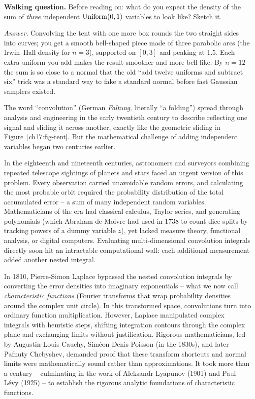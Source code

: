 \begin{walkbox}
\textbf{Walking question.} Before reading on: what do you expect the
density of the sum of \emph{three} independent $\operatorname{Uniform}(0,1)$ variables to
look like? Sketch it.

\emph{Answer.} Convolving the tent with one more box rounds the two
straight sides into curves; you get a smooth bell-shaped piece made of
three parabolic arcs (the Irwin--Hall density for $n=3$), supported on
$[0,3]$ and peaking at $1.5$. Each extra uniform you add makes the result
smoother and more bell-like. By $n=12$ the sum is so close to a normal
that the old ``add twelve uniforms and subtract six'' trick was a standard
way to fake a standard normal before fast Gaussian samplers existed.
\end{walkbox}

\begin{historybox}
The word ``convolution'' (German \emph{Faltung}, literally ``a folding'')
spread through analysis and engineering in the early twentieth century to
describe reflecting one signal and sliding it across another, exactly like
the geometric sliding in Figure~\ref{ch17:fig-tent}. But the mathematical
challenge of adding independent variables began two centuries earlier.

In the eighteenth and nineteenth centuries, astronomers and surveyors
combining repeated telescope sightings of planets and stars faced an urgent
version of this problem. Every observation carried unavoidable random errors,
and calculating the most probable orbit required the probability distribution
of the total accumulated error -- a sum of many independent random variables.
Mathematicians of the era had classical calculus, Taylor series, and generating
polynomials (which Abraham de Moivre had used in 1738 to count dice splits by
tracking powers of a dummy variable $z$), yet lacked measure theory, functional
analysis, or digital computers. Evaluating multi-dimensional convolution
integrals directly soon hit an intractable computational wall: each additional
measurement added another nested integral.

In 1810, Pierre-Simon Laplace bypassed the nested convolution integrals by
converting the error densities into imaginary exponentials -- what we now call
\emph{characteristic functions} (Fourier transforms that wrap probability
densities around the complex unit circle). In this transformed space,
convolutions turn into ordinary function multiplication.
However, Laplace manipulated complex integrals with heuristic steps,
shifting integration contours through the complex plane and exchanging
limits without justification. Rigorous mathematicians, led by
Augustin-Louis Cauchy, Sim\'eon Denis Poisson (in the 1830s), and later
Pafnuty Chebyshev, demanded proof that these transform shortcuts and
normal limits were mathematically sound rather than approximations. It took more than a
century -- culminating in the work of Aleksandr Lyapunov (1901) and Paul
L\'evy (1925) -- to establish the rigorous analytic foundations of
characteristic functions.


\end{historybox}
